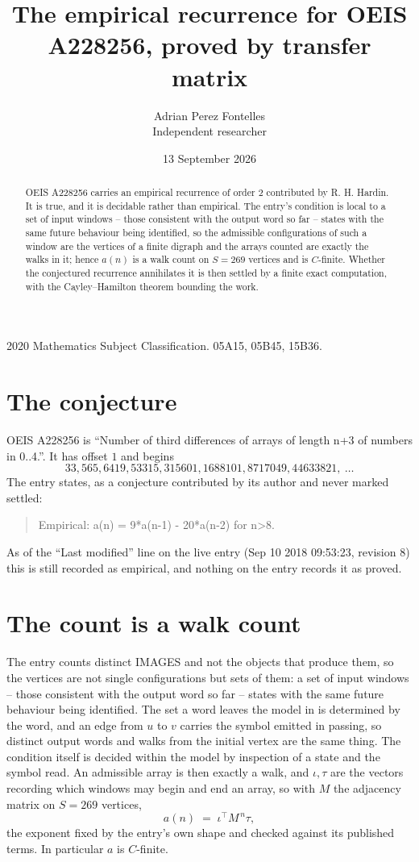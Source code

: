 \documentclass[11pt,a4paper]{article}
\title{The empirical recurrence for OEIS A228256, proved by transfer matrix}
\author{Adrian Perez Fontelles\\ \small Independent researcher}
\date{13 September 2026}
\theoremstyle{plain}
\theoremstyle{definition}
\begin{document}
\maketitle

\begin{abstract}
OEIS A228256 carries an empirical recurrence of order $2$ contributed by R. H. Hardin. It is
true, and it is decidable rather than empirical. The entry's condition is local to a set of input windows -- those consistent with the output word so far -- states with the same future behaviour being identified, so
the admissible configurations of such a window are the vertices of a finite digraph and the
arrays counted are exactly the walks in it; hence $a(n)$ is a walk count on $S=269$ vertices
and is $C$-finite. Whether the conjectured recurrence annihilates it is then settled by a
finite exact computation, with the Cayley--Hamilton theorem bounding the work.
\end{abstract}

\noindent\small 2020 Mathematics Subject Classification. 05A15, 05B45, 15B36.\normalsize

\section{The conjecture}

OEIS A228256 is ``Number of third differences of arrays of length n+3 of numbers in 0..4.''. It has offset $1$ and begins
\[
33, 565, 6419, 53315, 315601, 1688101, 8717049, 44633821,\ \dots
\]
The entry states, as a conjecture contributed by its author and never marked settled:
\begin{quote}
Empirical: a(n) = 9*a(n-1) - 20*a(n-2) for n>8.
\end{quote}
As of the ``Last modified'' line on the live entry (Sep 10 2018 09:53:23, revision 8) this is still
recorded as empirical, and nothing on the entry records it as proved.

\section{The count is a walk count}

The entry counts distinct IMAGES and not the objects that produce them, so the vertices are not single configurations but sets of them: a set of input windows -- those consistent with the output word so far -- states with the same future behaviour being identified. The set a word leaves the model in is determined by the word, and an edge from $u$ to $v$ carries the symbol emitted in passing, so distinct output words and walks from the initial vertex are the same thing. The condition itself is decided within the model by inspection of a state and the symbol read.
An admissible array is then exactly a walk, and $\iota,\tau$ are the vectors recording which windows may begin and end an array, so with $M$ the adjacency matrix on $S=269$ vertices,
\[
a(n)\;=\;\iota^{\!\top}M^{\,n}\tau ,
\]
the exponent fixed by the entry's own shape and checked against its published terms. In
particular $a$ is $C$-finite.
\end{document}
